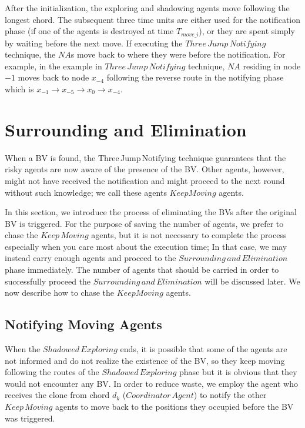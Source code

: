 
After the initialization, the exploring and shadowing agents move   following the longest chord. The subsequent three time units are either used for the notification phase (if one of the agents is destroyed at  time $T_{move\_i}$), or they are spent simply by waiting before the next move.
If  executing the $Three\,Jump\,Notifying$ technique,  the $NA$s move  back to where they were before the notification. For example, in the example in $Three\,Jump\,Notifying$ technique, $NA$ residing in node $-1$ moves back to node $x_{-4}$ following the reverse route in the notifying phase which is $x_{-1}{\rightarrow}x_{-5}{\rightarrow}x_0{\rightarrow}x_{-4}$. 

\section{Surrounding and Elimination}
 When a BV is found,  the Three\,Jump\,Notifying technique   guarantees that the risky agents are now aware of the presence of the BV. Other agents, however, might not have received the notification and might proceed to the next round without such knowledge; we call these agents $KeepMoving$ agents.   

In this section, we introduce the process of eliminating the BVs after the original BV is triggered. For the purpose of saving the number of agents, we prefer to chase the $Keep\,Moving$ agents, but it is not necessary to complete the process especially when you care most about the  execution time; In that case, we may  instead  carry enough agents  and  proceed to the $Surrounding\,and\,Elimination$ phase immediately. 
The number of agents that should be carried in order to successfully proceed the $Surrounding\,and\,Elimination$ will be discussed later.  We now describe how to chase the $KeepMoving$ agents.

\subsection{Notifying Moving Agents}


When the $Shadowed\,Exploring$ ends, it is possible that some of the agents  are not informed and do not realize the existence of the BV, so they keep moving following the routes of the  $Shadowed\,Exploring$  phase but it is obvious that they would not encounter any BV. In order to reduce waste, we employ the agent who receives the clone from chord $d_k$ ($Coordinator\,Agent$) to notify the other $Keep\,Moving$ agents to move back to the   positions  they occupied before the BV was triggered.

